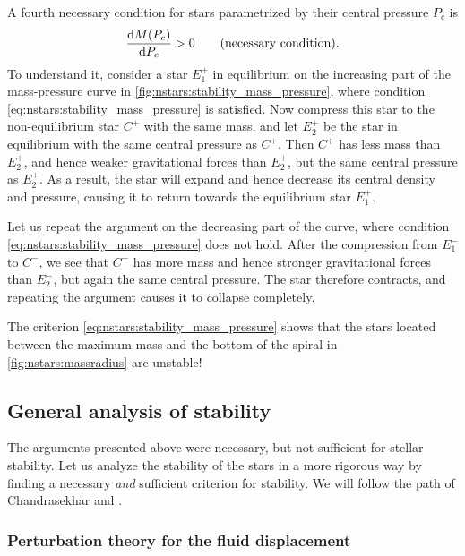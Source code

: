 A fourth necessary condition for stars parametrized by their central pressure $P_c$ is
\begin{equation}
	\odv{M(P_c)}{P_c} > 0
	\qquad \text{(necessary condition)} .
\label{eq:nstars:stability_mass_pressure}
\end{equation}
To understand it, consider a star $E_1^+$ in equilibrium on the increasing part of the mass-pressure curve in \cref{fig:nstars:stability_mass_pressure}, where condition \eqref{eq:nstars:stability_mass_pressure} is satisfied.
Now compress this star to the non-equilibrium star $C^+$ with the same mass, and let $E_2^+$ be the star in equilibrium with the same central pressure as $C^+$.
Then $C^+$ has less mass than $E_2^+$, and hence weaker gravitational forces than $E_2^+$, but the same central pressure as $E_2^+$.
As a result, the star will expand and hence decrease its central density and pressure, causing it to return towards the equilibrium star $E_1^+$.

Let us repeat the argument on the decreasing part of the curve, where condition \eqref{eq:nstars:stability_mass_pressure} does not hold.
After the compression from $E_1^-$ to $C^-$, we see that $C^-$ has more mass and hence stronger gravitational forces than $E_2^-$, but again the same central pressure.
The star therefore contracts, and repeating the argument causes it to collapse completely.

The criterion \eqref{eq:nstars:stability_mass_pressure} shows that the stars located between the maximum mass and the bottom of the spiral in \cref{fig:nstars:massradius} are unstable!

\subsection{General analysis of stability}
\label{sec:nstars:stability_general}

The arguments presented above were necessary, but not sufficient for stellar stability.
Let us analyze the stability of the stars in a more rigorous way by finding a necessary \emph{and} sufficient criterion for stability.
We will follow the path of Chandrasekhar \cite{ref:chandrasekhar_stability} and \cite[§ 26.4d]{ref:mtw}.

\subsubsection{Perturbation theory for the fluid displacement}

